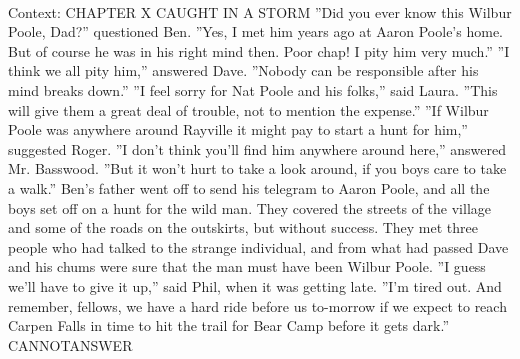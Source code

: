 \documentclass[11pt,a4paper, onecolumn]{article}
\begin{document}
\\ Context: CHAPTER X CAUGHT IN A STORM ''Did you ever know this Wilbur Poole, Dad?'' questioned Ben. ''Yes, I met him years ago at Aaron Poole's home. But of course he was in his right mind then. Poor chap! I pity him very much.'' ''I think we all pity him,'' answered Dave. ''Nobody can be responsible after his mind breaks down.'' ''I feel sorry for Nat Poole and his folks,'' said Laura. ''This will give them a great deal of trouble, not to mention the expense.'' ''If Wilbur Poole was anywhere around Rayville it might pay to start a hunt for him,'' suggested Roger. ''I don't think you'll find him anywhere around here,'' answered Mr. Basswood. ''But it won't hurt to take a look around, if you boys care to take a walk.'' Ben's father went off to send his telegram to Aaron Poole, and all the boys set off on a hunt for the wild man. They covered the streets of the village and some of the roads on the outskirts, but without success. They met three people who had talked to the strange individual, and from what had passed Dave and his chums were sure that the man must have been Wilbur Poole. ''I guess we'll have to give it up,'' said Phil, when it was getting late. ''I'm tired out. And remember, fellows, we have a hard ride before us to-morrow if we expect to reach Carpen Falls in time to hit the trail for Bear Camp before it gets dark.'' CANNOTANSWER
\end{document}
